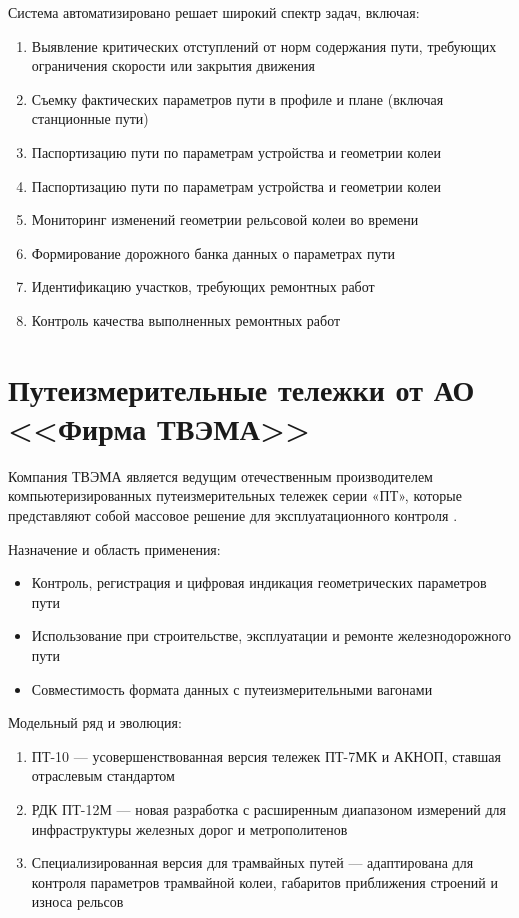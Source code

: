 Система автоматизировано решает широкий спектр задач, включая:
\begin{enumerate}
	\item Выявление критических отступлений от норм содержания пути, требующих ограничения скорости или закрытия движения
	\item Съемку фактических параметров пути в профиле и плане (включая станционные пути)
	\item Паспортизацию пути по параметрам устройства и геометрии колеи
	\item Паспортизацию пути по параметрам устройства и геометрии колеи
	\item Мониторинг изменений геометрии рельсовой колеи во времени
	\item Формирование дорожного банка данных о параметрах пути
	\item Идентификацию участков, требующих ремонтных работ
	\item Контроль качества выполненных ремонтных работ
\end{enumerate}


\section{Путеизмерительные тележки от АО <<Фирма ТВЭМА>>}
\label{sec:tvema}

Компания ТВЭМА является ведущим отечественным производителем компьютеризированных путеизмерительных тележек серии «ПТ», которые представляют собой массовое решение для эксплуатационного контроля \cite{website_tvema}.

Назначение и область применения:
\begin{itemize}
	\item Контроль, регистрация и цифровая индикация геометрических параметров пути
	\item Использование при строительстве, эксплуатации и ремонте железнодорожного пути
	\item Совместимость формата данных с путеизмерительными вагонами
\end{itemize}

Модельный ряд и эволюция:
\begin{enumerate}
	\item ПТ-10 — усовершенствованная версия тележек ПТ-7МК и АКНОП, ставшая отраслевым стандартом
	\item РДК ПТ-12М — новая разработка с расширенным диапазоном измерений для инфраструктуры железных дорог и метрополитенов
	\item Специализированная версия для трамвайных путей — адаптирована для контроля параметров трамвайной колеи, габаритов приближения строений и износа рельсов
\end{enumerate}

